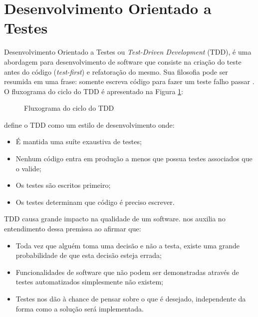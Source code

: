\section{Desenvolvimento Orientado a Testes}

Desenvolvimento Orientado a Testes ou \textit{Test-Driven Development} (TDD), é uma abordagem para desenvolvimento de software que consiste na criação do teste antes do código (\textit{test-first}) e refatoração do mesmo. Sua filosofia pode ser resumida em uma frase: somente escreva código para fazer um teste falho passar \cite{KOSKELA}. O fluxograma do ciclo do TDD é apresentado na Figura \ref{tdd}:

\begin{figure}[ht]
    \centering
    \caption{Fluxograma do ciclo do TDD}
    \label{tdd}
\end{figure}

 define o TDD como um estilo de desenvolvimento onde:
\begin{itemize}
    \item{É mantida uma suíte exaustiva de testes;}
    \item{Nenhum código entra em produção a menos que possua testes associados que o valide;}
    \item{Os testes são escritos primeiro;}
    \item{Os testes determinam que código é preciso escrever.}
\end{itemize}

TDD causa grande impacto na qualidade de um software.  nos auxilia no entendimento dessa premissa ao afirmar que:
\begin{itemize}
    \item{Toda vez que alguém toma uma decisão e não a testa, existe uma grande probabilidade de que esta decisão esteja errada;}
    \item{Funcionalidades de software que não podem ser demonstradas através de testes automatizados simplesmente não existem;}
    \item{Testes nos dão à chance de pensar sobre o que é desejado, independente da forma como a solução será implementada.}
\end{itemize}

